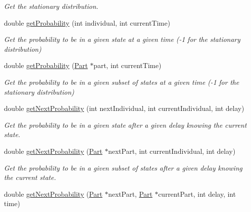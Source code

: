 \begin{DoxyCompactItemize}
\begin{DoxyCompactList}\small\item\em Get the stationary distribution. \end{DoxyCompactList}\item 
\hypertarget{class_markov_process_ad49d1ff46d5bf94e45a8b218b676c203}{}double \hyperlink{class_markov_process_ad49d1ff46d5bf94e45a8b218b676c203}{get\+Probability} (int individual, int current\+Time)\label{class_markov_process_ad49d1ff46d5bf94e45a8b218b676c203}

\begin{DoxyCompactList}\small\item\em Get the probability to be in a given state at a given time (-\/1 for the stationary distribution) \end{DoxyCompactList}\item 
\hypertarget{class_markov_process_afe80afb9c456631a9168c762058d3cd2}{}double \hyperlink{class_markov_process_afe80afb9c456631a9168c762058d3cd2}{get\+Probability} (\hyperlink{class_part}{Part} $\ast$part, int current\+Time)\label{class_markov_process_afe80afb9c456631a9168c762058d3cd2}

\begin{DoxyCompactList}\small\item\em Get the probability to be in a given subset of states at a given time (-\/1 for the stationary distribution) \end{DoxyCompactList}\item 
\hypertarget{class_markov_process_ab17f4ae9fa56c009553a5d50e899a84b}{}double \hyperlink{class_markov_process_ab17f4ae9fa56c009553a5d50e899a84b}{get\+Next\+Probability} (int next\+Individual, int current\+Individual, int delay)\label{class_markov_process_ab17f4ae9fa56c009553a5d50e899a84b}

\begin{DoxyCompactList}\small\item\em Get the probability to be in a given state after a given delay knowing the current state. \end{DoxyCompactList}\item 
\hypertarget{class_markov_process_a254635ef2e405073dd19aa14aa4ec365}{}double \hyperlink{class_markov_process_a254635ef2e405073dd19aa14aa4ec365}{get\+Next\+Probability} (\hyperlink{class_part}{Part} $\ast$next\+Part, int current\+Individual, int delay)\label{class_markov_process_a254635ef2e405073dd19aa14aa4ec365}

\begin{DoxyCompactList}\small\item\em Get the probability to be in a given subset of states after a given delay knowing the current state. \end{DoxyCompactList}\item 
\hypertarget{class_markov_process_a72033d86b846a06449a005f796ec14c1}{}double \hyperlink{class_markov_process_a72033d86b846a06449a005f796ec14c1}{get\+Next\+Probability} (\hyperlink{class_part}{Part} $\ast$next\+Part, \hyperlink{class_part}{Part} $\ast$current\+Part, int delay, int time)\label{class_markov_process_a72033d86b846a06449a005f796ec14c1}


\end{DoxyCompactItemize}
